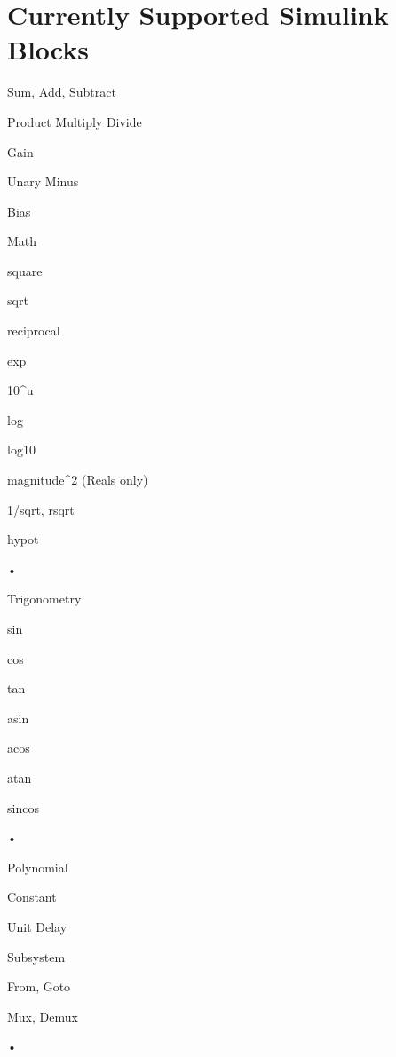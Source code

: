 \documentclass[12pt]{report}
\newenvironment{itemize*}
  {\begin{itemize}
    \setlength{\itemsep}{1pt}
    \setlength{\parskip}{1pt}}
  {\end{itemize}}
\begin{document}
\section{Currently Supported Simulink Blocks}
\begin{itemize*}	
\item Sum, Add, Subtract 
\item Product Multiply Divide
\item Gain
\item Unary Minus
\item Bias
\item Math
	\begin{itemize*}
	\item square
	\item sqrt
	\item reciprocal
	\item exp
	\item 10\string^u
	\item log
	\item log10
	\item magnitude\string^2 (Reals only)
	\item 1/sqrt, rsqrt
	\item hypot
	\end{itemize*}•
\item Trigonometry
	\begin{itemize*}
	\item sin
	\item cos
	\item tan
	\item asin
	\item acos
	\item atan
	\item sincos
	\end{itemize*}•
\item Polynomial
\item Constant
\item Unit Delay
\item Subsystem
\item From, Goto
\item Mux, Demux
\end{itemize*}•
\end{document}
